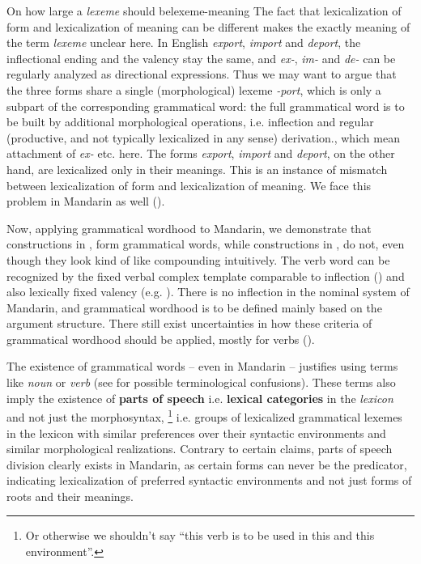 \documentclass[UTF8, a4paper, oneside, scheme=plain, 12pt]{ctexrep}
\newcommand*{\concept}[1]{\textbf{#1}}
\newcommand*{\term}[1]{\emph{#1}}
\newcommand{\form}[1]{\emph{#1}}
\begin{document}
\begin{theorybox}{On how large a \term{lexeme} should be}{lexeme-meaning}
    The fact that lexicalization of form and lexicalization of meaning
    can be different makes the exactly meaning of the term \term{lexeme} unclear here.
    In English \form{export}, \form{import} and \form{deport},
    the inflectional ending and the valency stay the same,
    and \form{ex-}, \form{im-} and \form{de-} can be regularly analyzed as directional expressions.
    Thus we may want to argue that the three forms share a single (morphological) lexeme \form{-port},
    which is only a subpart of the corresponding grammatical word:
    the full grammatical word is to be built by additional morphological operations,
    i.e. inflection and regular (productive, and not typically lexicalized in any sense) derivation.,
    which mean attachment of \form{ex-} etc. here.
    The forms \form{export}, \form{import} and \form{deport}, on the other hand,
    are lexicalized only in their meanings.
    This is an instance of mismatch between lexicalization of form
    and lexicalization of meaning.
    We face this problem in Mandarin as well ().
\end{theorybox}

Now, applying grammatical wordhood to Mandarin,
we demonstrate that constructions in ,
 form grammatical words,
while constructions in , 
do not, even though they look kind of like compounding intuitively.
The verb word can be recognized by the fixed verbal complex template comparable to inflection
()
and also lexically fixed valency (e.g. ).
There is no inflection in the nominal system of Mandarin,
and grammatical wordhood is to be defined mainly based on the argument structure.
There still exist uncertainties in how these criteria of grammatical wordhood should be applied,
mostly for verbs
().

The existence of grammatical words -- even in Mandarin --
justifies using terms like \term{noun} or \term{verb}
(see  for possible terminological confusions).
These terms also imply the existence of \concept{parts of speech} i.e. \concept{lexical categories}
in the \emph{lexicon} and not just the morphosyntax,%
\footnote{
    Or otherwise we shouldn't say ``this verb is to be used in this and this environment''.
}
i.e. groups of lexicalized grammatical lexemes in the lexicon 
with similar preferences over their syntactic environments and similar morphological realizations.
Contrary to certain claims, parts of speech division clearly exists in Mandarin,
as certain forms can never be the predicator, indicating lexicalization of preferred syntactic environments and not just forms of roots and their meanings.
\end{document}
